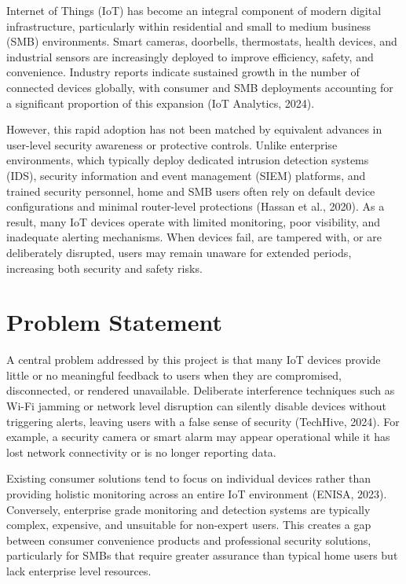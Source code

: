 Internet of Things (IoT) has become an integral component of modern digital infrastructure, particularly within residential and small to medium business (SMB) environments. Smart cameras, doorbells, thermostats, health devices, and industrial sensors are increasingly deployed to improve efficiency, safety, and convenience. Industry reports indicate sustained growth in the number of connected devices globally, with consumer and SMB deployments accounting for a significant proportion of this expansion (IoT Analytics, 2024).

However, this rapid adoption has not been matched by equivalent advances in user-level security awareness or protective controls. Unlike enterprise environments, which typically deploy dedicated intrusion detection systems (IDS), security information and event management (SIEM) platforms, and trained security personnel, home and SMB users often rely on default device configurations and minimal router-level protections (Hassan et al., 2020). As a result, many IoT devices operate with limited monitoring, poor visibility, and inadequate alerting mechanisms. When devices fail, are tampered with, or are deliberately disrupted, users may remain unaware for extended periods, increasing both security and safety risks.

\section{Problem Statement}

A central problem addressed by this project is that many IoT devices provide little or no meaningful feedback to users when they are compromised, disconnected, or rendered unavailable. Deliberate interference techniques such as Wi-Fi jamming or network level disruption can silently disable devices without triggering alerts, leaving users with a false sense of security (TechHive, 2024). For example, a security camera or smart alarm may appear operational while it has lost network connectivity or is no longer reporting data.

Existing consumer solutions tend to focus on individual devices rather than providing holistic monitoring across an entire IoT environment (ENISA, 2023). Conversely, enterprise grade monitoring and detection systems are typically complex, expensive, and unsuitable for non-expert users. This creates a gap between consumer convenience products and professional security solutions, particularly for SMBs that require greater assurance than typical home users but lack enterprise level resources.

